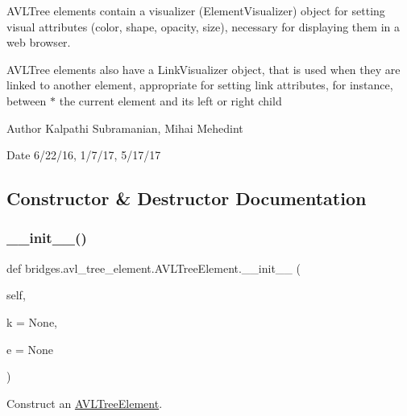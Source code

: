 A\+V\+L\+Tree elements contain a visualizer (Element\+Visualizer) object for setting visual attributes (color, shape, opacity, size), necessary for displaying them in a web browser.

A\+V\+L\+Tree elements also have a Link\+Visualizer object, that is used when they are linked to another element, appropriate for setting link attributes, for instance, between $\ast$ the current element and its left or right child

\begin{DoxyAuthor}{Author}
Kalpathi Subramanian, Mihai Mehedint
\end{DoxyAuthor}
\begin{DoxyDate}{Date}
6/22/16, 1/7/17, 5/17/17 
\end{DoxyDate}


\subsection{Constructor \& Destructor Documentation}
\mbox{\label{classbridges_1_1avl__tree__element_1_1_a_v_l_tree_element_a2fdd99adfaedb5dc49385e6c5e05aa10}} 
\subsubsection{\texorpdfstring{\+\_\+\+\_\+init\+\_\+\+\_\+()}{\_\_init\_\_()}}
{\footnotesize\ttfamily def bridges.\+avl\+\_\+tree\+\_\+element.\+A\+V\+L\+Tree\+Element.\+\_\+\+\_\+init\+\_\+\+\_\+ (\begin{DoxyParamCaption}\item[{}]{self,  }\item[{}]{k = {\ttfamily None},  }\item[{}]{e = {\ttfamily None} }\end{DoxyParamCaption})}



Construct an \mbox{\hyperlink{classbridges_1_1avl__tree__element_1_1_a_v_l_tree_element}{A\+V\+L\+Tree\+Element}}. 


